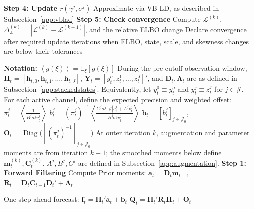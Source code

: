\begin{algorithm}
\begin{algorithmic}
        \State \textbf{Step 4: Update $r(\gamma^j, \sigma^j )$}
        \State Approximate via VB-LD, as described in Subsection~\ref{app:vblad}
    \EndFor
    \State \textbf{Step 5: Check convergence}
    \State Compute \(\mathcal{L}^{(k)}\), \(\Delta_{\mathcal{L}}^{(k)}=|\mathcal{L}^{(k)}-\mathcal{L}^{(k-1)}|\), and the relative ELBO change
    \State Declare convergence after required update iterations when ELBO,
    \Statex \hspace{\algorithmicindent} state, scale, and skewness changes are below their tolerances
\EndWhile

\end{algorithmic}
\end{algorithm}

\begin{algorithm}
\caption{VB-Filtering and VB-Smoothing}
\label{alg:Alg4}
\begin{algorithmic}

\State \textbf{Notation:}
\State $\left\langle g(\xi) \right\rangle = \mathbb{E}_\xi\left[ g(\xi) \right]$
\State  During the pre-cutoff observation window, \(\mathbf{H}_t = [\mathbf{h}_{t,0}, \mathbf{h}_{t,1}, \ldots, \mathbf{h}_{t,J}]\), \(\mathbf{Y}_t = [y_t^o, z_t^1, \ldots, z_t^J]'\), and \(\mathbf{D}_t, \boldsymbol{\Lambda}_t\) are as defined in Subsection~\ref{app:stackedstates}.
\State  Equivalently, let \(y_t^0 \equiv y_t^o\) and \(y_t^j \equiv z_t^j\) for \(j\in\mathcal{J}\).
\State For each active channel, define the expected precision and weighted offset:
\State $\pi_t^j=\left\langle\frac{1}{B^j\sigma^jv_t^j}\right\rangle$
\State $b_t^j=(\pi_t^j)^{-1}\left\langle\frac{C^j\sigma^j|\gamma^j|s_t^j+A^jv_t^j}{B^j\sigma^jv_t^j}\right\rangle$
\State $\mathbf b_t=[b_t^j]_{j\in\mathcal J_0}$, \quad $\mathbf O_t=\operatorname{Diag}\big([(\pi_t^j)^{-1}]_{j\in\mathcal J_0}\big)$
\State At outer iteration \(k\), augmentation and parameter moments are from iteration \(k-1\); the smoothed moments below define \(\mathbf m_t^{(k)},\mathbf C_t^{(k)}\).
\State \(A^j,B^j,C^j\) are defined in Subsection~\ref{app:augmentation}.
\State \textbf{Step 1: Forward Filtering}
    \State Compute Prior moments:
    \State $\mathbf{a}_t = \mathbf{D}_t \mathbf{m}_{t-1}$
    \State $\mathbf{R}_t = \mathbf{D}_t \mathbf{C}_{t-1} \mathbf{D}_t' +  \boldsymbol{\Lambda}_t$

    \State One-step-ahead forecast:
    \State $\mathbf{f}_t = \mathbf{H}_t'\mathbf{a}_t + \mathbf{b}_t$
    \State $\mathbf{Q}_t = \mathbf{H}_t'\mathbf{R}_t\mathbf{H}_t + \mathbf{O}_t$


\end{algorithmic}
\end{algorithm}
